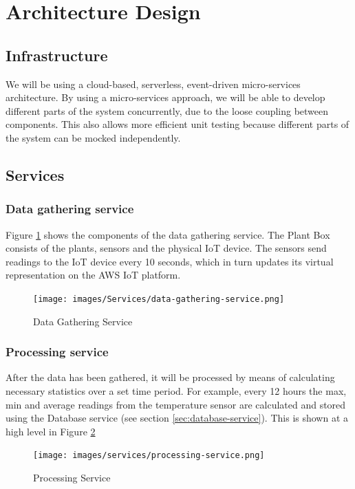 \documentclass{article}
\begin{document}
\section{Architecture Design}

\subsection{Infrastructure}
We will be using a cloud-based, serverless, event-driven micro-services architecture. By using a micro-services approach, we will be able to develop different parts of the system concurrently, due to the loose coupling between components. This also allows more efficient unit testing because different parts of the system can be mocked independently. 

\subsection{Services}

\subsubsection{Data gathering service}
Figure \ref{fig:data-gathering} shows the components of the data gathering service. The Plant Box consists of the plants, sensors and the physical IoT device. The sensors send readings to the IoT device every 10 seconds, which in turn updates its virtual representation on the AWS IoT platform.

\begin{figure}[h!]
  \texttt{[image: images/Services/data-gathering-service.png]}
  \caption{Data Gathering Service}
  \label{fig:data-gathering}
\end{figure}

\subsubsection{Processing service}
After the data has been gathered, it will be processed by means of calculating necessary statistics over a set time period. For example, every 12 hours the max, min and average readings from the temperature sensor are calculated and stored using the Database service (see section \ref{sec:database-service}). This is shown at a high level in Figure \ref{fig:processing-service}

\begin{figure}[h!]
  \texttt{[image: images/services/processing-service.png]}
  \caption{Processing Service}
  \label{fig:processing-service}
\end{figure}
\end{document}
